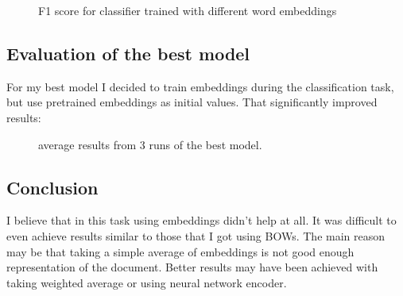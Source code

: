 \documentclass{article}
\begin{document}
\begin{figure}[h]
	\centering
	
	\caption{F1 score for classifier trained with different word embeddings}
\end{figure}

\subsection{Evaluation of the best model}
For my best model I decided to train embeddings during the classification task,
but use pretrained embeddings as initial values. That significantly improved results:

\begin{figure}[h]
	\centering
	\begin{minipage}{0.45\textwidth}
	\scalebox{0.7}{}
	\end{minipage}
	\begin{minipage}{0.45\textwidth}
	\centering
	\scalebox{0.7}{}
	\end{minipage}
	\caption{average results from 3 runs of the best model.}
\end{figure}

\subsection{Conclusion}
I believe that in this task using embeddings didn't help at all. It was
difficult to even achieve results similar to those that I got using BOWs.
The main reason may be that taking a simple average of embeddings is not
good enough representation of the document. Better results may have been
achieved with taking weighted average or using neural network encoder.
\end{document}

